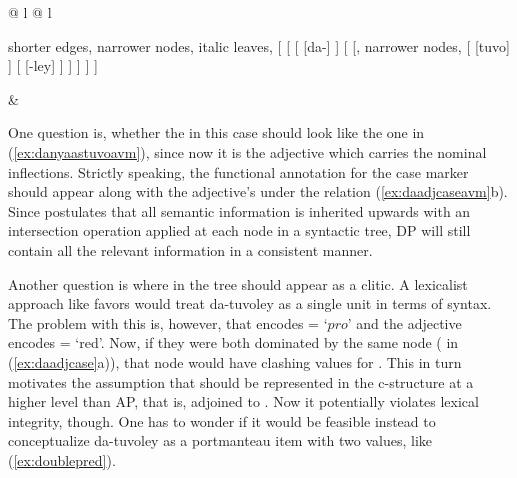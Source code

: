 \ex{}
\begin{tabular}[t]{@{} l @{\quad} l}
\tl\quad\label{ex:daadjcase}\ques%
\begin{forest} shorter edges, narrower nodes, italic leaves,
[{}
	[\anno{\xbar{D}}
		[\anno{Cl}
			[da-]
		]
		[{\anno[\elem{\Adjc}]{AP}}
				[, narrower nodes,
					[\anno{A\tsub{stem}}
						[tuvo]
					]
					[\anno{A\tsub{infl}}
						[-ley]
					]
				]
		]
	]
]
\end{forest}

&

\tl\quad\label{ex:daadjcaseavm} \ques{}
\end{tabular}
\xe

One question is, whether the \Avm{} in this case should look like the one in
(\ref{ex:danyaastuvoavm}), since now it is the adjective which carries the
nominal inflections. Strictly speaking, the functional annotation for the
case marker should appear along with the adjective's \Pred{} under the
\Adjc{} relation (\ref{ex:daadjcaseavm}b). Since \Lfg{} postulates that all
semantic information is inherited upwards with an intersection operation
applied at each node in a syntactic tree, DP will still contain all the
relevant information in a consistent manner.

Another question is where in the tree  should appear as a clitic.
A lexicalist approach like \Lfg{} favors would treat 
{da-tuvoley} as a single unit in terms of syntax. The problem with this is,
however, that  encodes \ups{\Pred} = `$pro$' and the adjective
encodes \ups{\Pred} = `red'. Now, if they were both dominated by the same node
( in (\ref{ex:daadjcase}a)), that node would have clashing values for
\Pred{}. This in turn motivates the assumption that  should be
represented in the c-structure at a higher level than AP, that is, adjoined to
. Now it potentially violates lexical integrity, though. One has to
wonder if it would be feasible instead to conceptualize 
{da-tuvoley} as a portmanteau item with two \Pred{} values, like
(\ref{ex:doublepred}).

